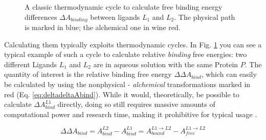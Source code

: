 \documentclass[oneside]{scrreprt}
\begin{document}
\begin{figure}[H]
   
    
    

  \begin{center}

    
    \caption[Thermodynamic cycle for RBFE differences]{A classic thermodynamic cycle to calculate free binding energy differences $\Delta A_{binding}$ between ligands $L_1$ and $L_2$. The physical path is marked in blue; the alchemical one in wine red.} 
    \label{fig:thermocycle_rbfe}
  \end{center}
\end{figure}

Calculating them typically exploits thermodynamic cycles. In Fig. \ref{fig:thermocycle_rbfe} you can see a typical example of such a cycle to calculate relative \emph{binding} free energies: two different Ligands $L_1$ and $L_2$ are in aqueous solution with the same Protein $P$. The quantity of interest is the relative binding free energy $\Delta \Delta A_{bind}$, which can easily be calculated by using the nonphysical - \emph{alchemical} transformations marked in red (Eq. \ref{eq:deltadeltaAbind}). While it would, theoretically, be possible to calculate $\Delta A^{L1}_{bind}$ directly, doing so still requires massive amounts of computational power and research time, making it prohibitive for typical usage \cite{fujitani_direct_2005}.

\begin{equation}
    \Delta \Delta A_{bind} = A^{L2}_{bind}-A^{L1}_{bind}=A^{L1\rightarrow L2}_{bound}-A^{L1\rightarrow L2}_{free}
    \label{eq:deltadeltaAbind}
\end{equation}
\end{document}
